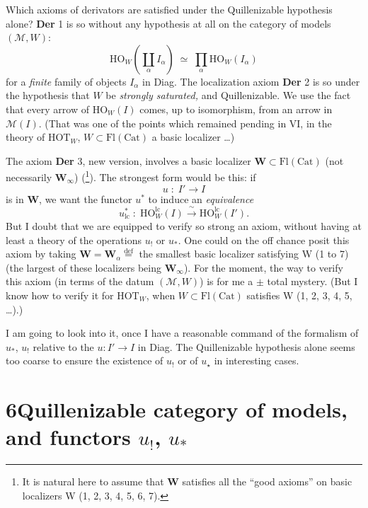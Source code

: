 \documentclass[11pt]{article}
\newcommand{\printedpage}[1]{\marginpar{\footnotesize p.~#1}}
\newcommand{\msp}[1]{\marginpar{\footnotesize [#1]}}
\begin{document}
Which axioms of derivators are satisfied under the Quillenizable hypothesis alone? \textbf{Der} 1 is so without any hypothesis at all on the category of models $(\mathcal{M},W)$:
\[ \mathrm{HO}_{W}(\coprod_{\alpha} I_{\alpha}) \;\simeq\; \prod_{\alpha} \mathrm{HO}_{W}(I_{\alpha}) \]
for a \textit{finite} family of objects $I_{\alpha}$ in Diag. The localization axiom \textbf{Der} 2 is so under the hypothesis that $W$ be \textit{strongly saturated,} and Quillenizable. We use the fact that every arrow of $\mathrm{HO}_{W}(I)$ comes, up to isomorphism, from an arrow in $\mathcal{M}(I)$. (That was one of the points which remained pending in VI, in the theory of $\mathrm{HOT}_{W}$, $W \subset \mathrm{Fl}(\mathrm{Cat})$ a basic localizer \dots)

The axiom \textbf{Der} 3, new version, involves a basic localizer $\mathbf{W} \subset \mathrm{Fl}(\mathrm{Cat})$ (not necessarily $\mathbf{W}_{\infty}$) (\footnote[33]{It is natural here to assume that $\mathbf{W}$ satisfies all the ``good axioms'' on basic localizers W (1, 2, 3, 4, 5, 6, 7).}). The strongest form would be this: if
\[ u \;:\; I' \longrightarrow I \]
\msp{page 56}is in $\mathbf{W}$, we want the functor $u^{*}$ to induce an \textit{equivalence}
\[ u_{\mathrm{lc}}^{*} \;:\; \mathrm{HO}_{W}^{\mathrm{lc}}(I) \xrightarrow{\;\sim\;} \mathrm{HO}_{W}^{\mathrm{lc}}(I'). \]
But I doubt that we are equipped to verify so strong an axiom, without having at least a theory of the operations $u_{!}$ or $u_{*}$. One could on the off chance posit this axiom by taking $\mathbf{W} = \mathbf{W}_{\alpha} \overset{\text{def}}{=}$ the smallest basic localizer satisfying W (1 to 7) (the largest of
\printedpage{32}
these localizers being $\mathbf{W}_{\infty}$). For the moment, the way to verify this axiom (in terms of the datum $(\mathcal{M},W)$) is for me a $\pm$ total mystery. (But I know how to verify it for $\mathrm{HOT}_{W}$, when $W \subset \mathrm{Fl}(\mathrm{Cat})$ satisfies W (1, 2, 3, 4, 5, \dots).)

I am going to look into it, once I have a reasonable command of the formalism of $u_{*}$, $u_{!}$ relative to the $u : I' \longrightarrow I$ in Diag. The Quillenizable hypothesis alone seems too coarse to ensure the existence of $u_{!}$ or of $u_{\star}$ in interesting cases. %

\noindent\msp{page 57}

\section*{6\quad Quillenizable category of models, and functors $u_{!}$, $u_{*}$}
\end{document}
